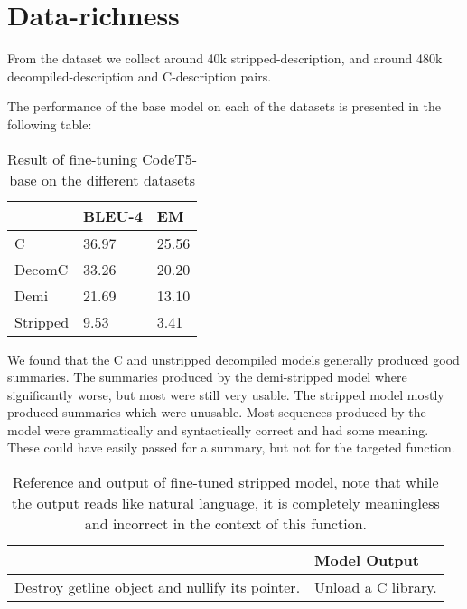 
\section{Data-richness}
From the dataset we collect around 40k stripped-description, and around 480k decompiled-description and C-description pairs. 

The performance of the base model on each of the datasets is presented in the following table:
\label{tab:duplicated}
\begin{table}[!h]
\centering
\begin{tabular}{lll}
\hline
\rowcolor[HTML]{C0C0C0} 
\multicolumn{1}{|l}{\cellcolor[HTML]{C0C0C0}\textbf{Duplicated}} & BLEU-4  & \multicolumn{1}{l|}{\cellcolor[HTML]{C0C0C0}EM} \\ \hline
C                                                                  & 36.97 & 25.56                                           \\
DecomC                                                             & 33.26 & 20.20                                           \\
Demi                                                               & 21.69 & 13.10   
                            \\
Stripped                                                           & 9.53  & 3.41                \end{tabular}
\caption{Result of fine-tuning CodeT5-base on the different datasets}
\end{table}

We found that the C and unstripped decompiled models generally produced good summaries. The summaries produced by the demi-stripped model where significantly worse, but most were still very usable. The stripped model mostly produced summaries which were unusable. Most sequences produced by the model were grammatically and syntactically correct and had some meaning. These could have easily passed for a summary, but not for the targeted function.

\label{tab:syntax}
\begin{table}[!h]
\centering
\begin{tabular}{ll}
\hline
\rowcolor[HTML]{9B9B9B} 
\multicolumn{1}{|l}{\cellcolor[HTML]{9B9B9B}Reference} & \multicolumn{1}{l|}{\cellcolor[HTML]{9B9B9B}Model Output}    \\ \hline
Destroy getline object and nullify its pointer.               & Unload a C library.
\end{tabular}
\caption{Reference and output of fine-tuned stripped model, note that while the output reads like natural language, it is completely meaningless and incorrect in the context of this function.}
\end{table}

